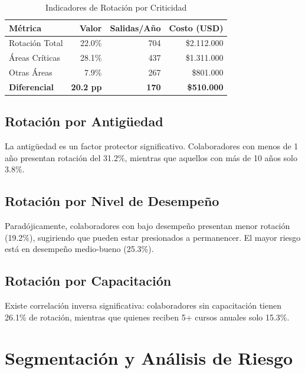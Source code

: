 \documentclass[11pt,a4paper,twoside]{article}
\begin{document}
\begin{table}[H]
    \centering
    \caption{Indicadores de Rotación por Criticidad}
    \begin{tabular}{|l|r|r|r|}
        \toprule
        \textbf{Métrica} & \textbf{Valor} & \textbf{Salidas/Año} & \textbf{Costo (USD)} \\
        \midrule
        Rotación Total & 22.0\% & 704 & \$2.112.000 \\
        Áreas Críticas & 28.1\% & 437 & \$1.311.000 \\
        Otras Áreas & 7.9\% & 267 & \$801.000 \\
        \midrule
        \textbf{Diferencial} & \textbf{20.2 pp} & \textbf{170} & \textbf{\$510.000} \\
        \bottomrule
    \end{tabular}
\end{table}

\subsection{Rotación por Antigüedad}

La antigüedad es un factor protector significativo. Colaboradores con menos de 1 año presentan rotación del 31.2\%, mientras que aquellos con más de 10 años solo 3.8\%.

\subsection{Rotación por Nivel de Desempeño}

Paradójicamente, colaboradores con bajo desempeño presentan menor rotación (19.2\%), sugiriendo que pueden estar presionados a permanencer. El mayor riesgo está en desempeño medio-bueno (25.3\%).

\subsection{Rotación por Capacitación}

Existe correlación inversa significativa: colaboradores sin capacitación tienen 26.1\% de rotación, mientras que quienes reciben 5+ cursos anuales solo 15.3\%.

\newpage

\section{Segmentación y Análisis de Riesgo}
\end{document}
